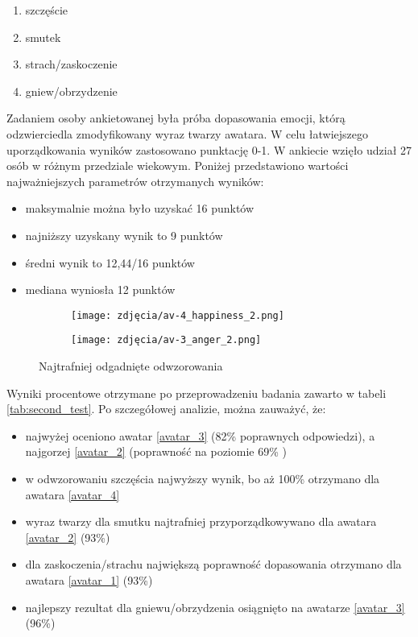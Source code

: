 \begin{enumerate}
    \item szczęście
    \item smutek
    \item strach/zaskoczenie
    \item gniew/obrzydzenie
\end{enumerate}



Zadaniem osoby ankietowanej była próba dopasowania emocji, którą odzwierciedla zmodyfikowany wyraz twarzy awatara. W celu łatwiejszego uporządkowania wyników zastosowano punktację 0-1. W ankiecie wzięło udział 27 osób w różnym przedziale wiekowym. Poniżej przedstawiono wartości najważniejszych parametrów otrzymanych wyników:
\begin{itemize}
    \item maksymalnie można było uzyskać 16 punktów
    \item najniższy uzyskany wynik to 9 punktów
    \item średni wynik to 12,44/16 punktów
    \item mediana wyniosła 12 punktów
\end{itemize}

\begin{figure}[h]
	\centering
	\begin{subfigure}{0.35\textwidth}
		\centering
		\texttt{[image: zdjęcia/av-4\_happiness\_2.png]}
		\subcaption{\label{av-4_happiness_2}}
	\end{subfigure}
	\begin{subfigure}{0.35\textwidth}
		\centering
		\texttt{[image: zdjęcia/av-3\_anger\_2.png]}
		\subcaption{\label{av-3_anger_2}}
	\end{subfigure}

	
	\caption{\label{fig:best_results}Najtrafniej odgadnięte odwzorowania}
\end{figure}

Wyniki procentowe otrzymane po przeprowadzeniu badania zawarto w tabeli \ref{tab:second_test}. Po szczegółowej analizie, można zauważyć, że:
\begin{itemize}
    \item najwyżej oceniono awatar \ref{avatar_3} (82\% poprawnych odpowiedzi), a najgorzej \ref{avatar_2} (poprawność na poziomie 69\% )
    \item w odwzorowaniu szczęścia najwyższy wynik, bo aż 100\% otrzymano dla awatara \ref{avatar_4}
    \item wyraz twarzy dla smutku najtrafniej przyporządkowywano dla awatara \ref{avatar_2} (93\%)
    \item dla zaskoczenia/strachu największą poprawność dopasowania otrzymano dla awatara \ref{avatar_1} (93\%)
    \item najlepszy rezultat dla gniewu/obrzydzenia osiągnięto na awatarze \ref{avatar_3} (96\%)
\end{itemize}

